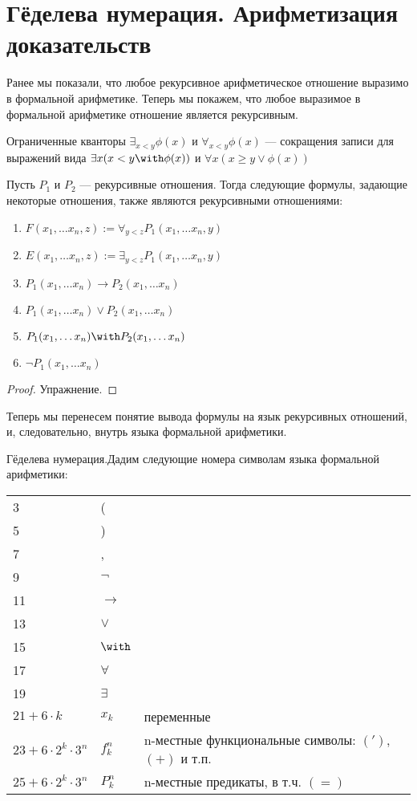 \section{Гёделева нумерация. Арифметизация доказательств}

Ранее мы показали, что любое рекурсивное арифметическое отношение 
выразимо в формальной арифметике. Теперь мы покажем, что 
любое выразимое в формальной арифметике отношение является рекурсивным.

\begin{definition} Ограниченные кванторы $\exists_{x<y} \phi(x)$ и
$\forall_{x<y} \phi(x)$ --- сокращения записи для выражений вида 
$\exists x (x < y \with \phi(x))$ и $\forall x (x \ge y \vee \phi (x))$
\end{definition}

\begin{theorem} Пусть $P_1$ и $P_2$ --- рекурсивные отношения.
Тогда следующие формулы, задающие некоторые отношения, также являются 
рекурсивными отношениями:

\begin{enumerate}
\item $F(x_1,\dots x_n,z) := \forall_{y<z} P_1(x_1,\dots x_n,y)$
\item $E(x_1, \dots x_n,z) := \exists_{y<z} P_1(x_1,\dots x_n,y)$
\item $P_1(x_1,\dots x_n) \rightarrow P_2(x_1,\dots x_n)$
\item $P_1(x_1,\dots x_n) \vee P_2(x_1,\dots x_n)$
\item $P_1(x_1,\dots x_n) \with P_2(x_1,\dots x_n)$
\item $\neg P_1(x_1, \dots x_n)$
\end{enumerate}
\end{theorem}

\begin{proof}Упражнение.
\end{proof}

Теперь мы перенесем понятие вывода формулы на язык рекурсивных отношений,
и, следовательно, внутрь языка формальной арифметики.

\begin{definition}{Гёделева нумерация.}Дадим следующие номера символам языка
формальной арифметики:

\begin{tabular}{lll}
3 & (\\
5 & )\\
7 & ,\\
9 & $\neg$ \\
11 & $\rightarrow$ \\
13 & $\vee$ \\
15 & $\with$ \\
17 & $\forall$ \\
19 & $\exists$ \\
$21 + 6\cdot k$ & $x_k$ & переменные\\
$23 + 6\cdot 2^k \cdot 3^n$ & $f_k^n$ & n-местные функциональные символы: $(')$, $(+)$ и т.п.\\
$25 + 6\cdot 2^k \cdot 3^n$ & $P_k^n$ & n-местные предикаты, в т.ч. $(=)$
\end{tabular}
\end{definition}

